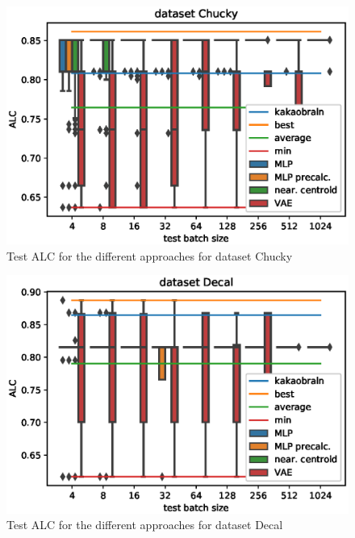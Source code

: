 \documentclass{article}
\begin{document}
%
\begin{figure}[H]
\begin{center}
 	\includegraphics[width=0.99\linewidth]{../figures/14.eps} 
\end{center}
\caption{Test ALC for the different approaches for dataset Chucky}
\label{fig:14}
\end{figure} 
%
\begin{figure}[H]
\begin{center}
 	\includegraphics[width=0.99\linewidth]{../figures/15.eps} 
\end{center}
\caption{Test ALC for the different approaches for dataset Decal}
\label{fig:15}
\end{figure} 
%
\end{document}
